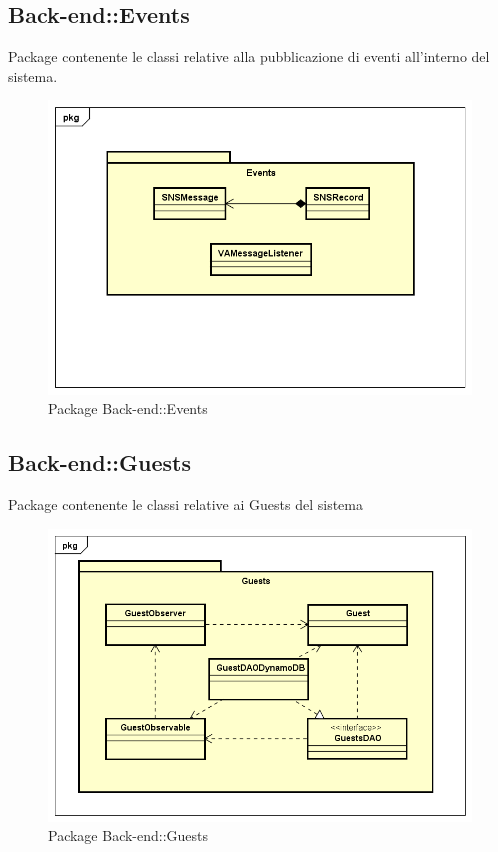 \subsection{Back-end::Events}
Package contenente le classi relative alla pubblicazione di eventi all'interno del sistema.
\begin{figure}[h] \centering \includegraphics[width=\textwidth,height=\textheight,keepaspectratio]{images/diagrams/back-end/Official_Backend_0304/Events.png}
\caption{Package Back-end::Events}
\end{figure}
\newpage

\subsection{Back-end::Guests}
Package contenente le classi relative ai Guests del sistema
\begin{figure}[h] \centering \includegraphics[width=\textwidth,height=\textheight,keepaspectratio]{images/diagrams/back-end/Official_Backend_0304/Guests.png}
\caption{Package Back-end::Guests}
\end{figure}
\newpage

